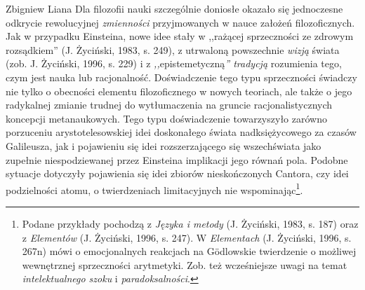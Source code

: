 \begin{artplenv}{Zbigniew Liana}
Dla filozofii nauki szczególnie doniosłe okazało się jednoczesne odkrycie rewolucyjnej \textit{zmienności} przyjmowanych w nauce
założeń filozoficznych. Jak w przypadku Einsteina, nowe idee stały w ,,rażącej sprzeczności ze zdrowym rozsądkiem''
\label{ref:RND5BoFYxeq4l}(J. Życiński, 1983, s. 249), z utrwaloną powszechnie \textit{wizją} świata
\label{ref:RND3mHQnO08gW}(zob. J. Życiński, 1996, s. 229) i z \textit{,,}epistemetyczną\textit{'' tradycją} rozumienia tego,
czym jest nauka lub racjonalność.  Doświadczenie tego typu sprzeczności świadczy nie tylko o obecności elementu
filozoficznego w nowych teoriach, ale także o jego radykalnej zmianie trudnej do wytłumaczenia na gruncie
racjonalistycznych koncepcji metanaukowych. Tego typu doświadczenie towarzyszyło zarówno porzuceniu arystotelesowskiej
idei doskonałego świata nadksiężycowego za czasów Galileusza, jak i pojawieniu się idei rozszerzającego się
wszechświata jako zupełnie niespodziewanej przez Einsteina implikacji jego równań pola. Podobne sytuacje dotyczyły
pojawienia się idei zbiorów nieskończonych Cantora, czy idei podzielności atomu, o twierdzeniach limitacyjnych nie
wspominając\footnote{Podane przykłady pochodzą z \textit{Języka i metody} \label{ref:RNDrtmG57I1dG}(J. Życiński, 1983,
s. 187) oraz z \textit{Elementów} \label{ref:RNDorQuglTydR}(J. Życiński, 1996, s. 247). W \textit{Elementach}
\label{ref:RNDYo0f9hcHkW}(J. Życiński, 1996, s. 267n) mówi o emocjonalnych reakcjach na Gödlowskie twierdzenie o możliwej
wewnętrznej sprzeczności arytmetyki. Zob. też wcześniejsze uwagi na temat \textit{intelektualnego szoku} i \textit{paradoksalności}.}.


\end{artplenv}
